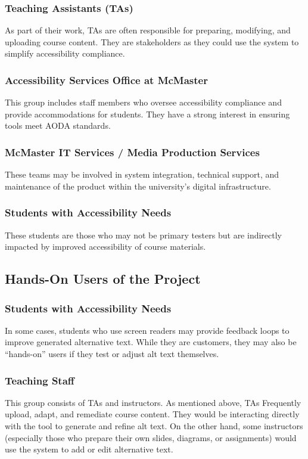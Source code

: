 \documentclass[12pt]{article}
\begin{document}
\subsubsection {Teaching Assistants (TAs)}
As part of their work, TAs are often responsible for preparing,
modifying, and uploading course
content. They are stakeholders as they could use the system to
simplify accessibility compliance.
\subsubsection {Accessibility Services Office at McMaster}
This group includes staff members who oversee accessibility
compliance and provide
accommodations for students. They have a strong interest in ensuring
tools meet AODA standards.
\subsubsection {McMaster IT Services / Media Production Services}
These teams may be involved in system integration, technical support,
and maintenance of the product within the university’s digital infrastructure.
\subsubsection {Students with Accessibility Needs}
These students are those who may not be primary testers but are
indirectly impacted
by improved accessibility of course materials.
\subsection{Hands-On Users of the Project}
\subsubsection{Students with Accessibility Needs}
In some cases, students who use screen readers may provide feedback
loops to improve generated alternative text. While they are customers, they
may also be “hands-on” users if they test or adjust alt text themselves.
\subsubsection{Teaching Staff}
This group consists of TAs and instructors. As mentioned above, TAs
Frequently upload, adapt, and remediate course content. They would be
interacting directly with the tool to generate and refine alt text.
On the other hand, some instructors (especially those who prepare
their own slides, diagrams, or assignments) would use the system to
add or edit alternative text.
\end{document}
